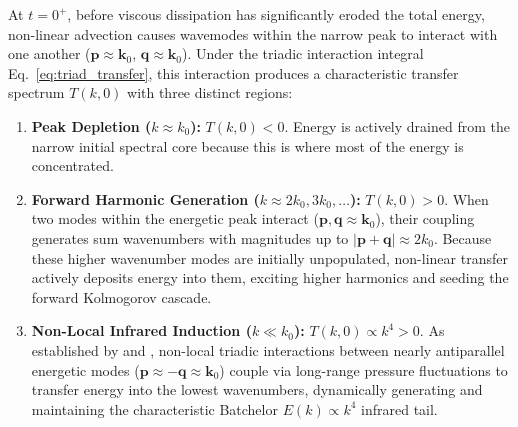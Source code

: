 \documentclass[lineno]{jfm}
\begin{document}
At $t = 0^+$, before viscous dissipation has significantly eroded the total energy, non-linear advection causes wavemodes within the narrow peak to interact with one another ($\mathbf{p} \approx \mathbf{k}_0$, $\mathbf{q} \approx \mathbf{k}_0$). Under the triadic interaction integral Eq.~\eqref{eq:triad_transfer}, this interaction produces a characteristic transfer spectrum $T(k, 0)$ with three distinct regions:
\begin{enumerate}
\item \textbf{Peak Depletion ($k \approx k_0$):} $T(k, 0) < 0$. Energy is actively drained from the narrow initial spectral core because this is where most of the energy is concentrated.
\item \textbf{Forward Harmonic Generation ($k \approx 2k_0, 3k_0, \dots$):} $T(k, 0) > 0$. When two modes within the energetic peak interact ($\mathbf{p}, \mathbf{q} \approx \mathbf{k}_0$), their coupling generates sum wavenumbers with magnitudes up to $|\mathbf{p} + \mathbf{q}| \approx 2k_0$. Because these higher wavenumber modes are initially unpopulated, non-linear transfer actively deposits energy into them, exciting higher harmonics and seeding the forward Kolmogorov cascade.
\item \textbf{Non-Local Infrared Induction ($k \ll k_0$):} $T(k, 0) \propto k^4 > 0$. As established by \citet{ProudmanReid1954} and \citet{BatchelorProudman1956}, non-local triadic interactions between nearly antiparallel energetic modes ($\mathbf{p} \approx -\mathbf{q} \approx \mathbf{k}_0$) couple via long-range pressure fluctuations to transfer energy into the lowest wavenumbers, dynamically generating and maintaining the characteristic Batchelor $E(k) \propto k^4$ infrared tail.
\end{enumerate}
\end{document}
